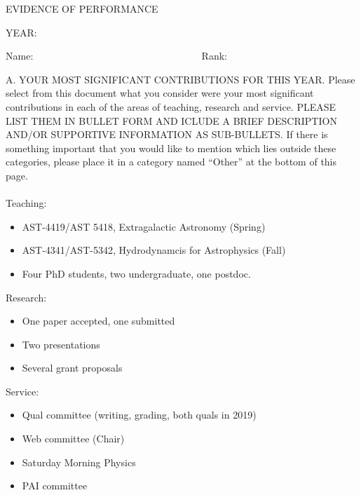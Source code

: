 \addtolength{\topmargin}{-.5in}
\addtolength{\textheight}{2.5cm}
\addtolength{\oddsidemargin}{-.75in}
\addtolength{\evensidemargin}{-.75in}
\addtolength{\textwidth}{.5in}


\centerline{EVIDENCE OF PERFORMANCE}
\bigskip
\centerline{YEAR: }
\bigskip
\noindent Name: 
\hbox{\ \ \ \ \ \ \ \
\ \ \ \ \ \ \ \ \ \ \ \ \ \ \ \ \ \ \ \ \ \ \ \ \ }
Rank: \underbar
{ }

\vskip 20pt

\noindent A. YOUR MOST SIGNIFICANT CONTRIBUTIONS FOR THIS YEAR.
Please select from this document what you consider were your most
significant contributions in each of the areas of teaching, research
and service. PLEASE LIST THEM IN BULLET FORM AND ICLUDE A BRIEF 
DESCRIPTION AND/OR SUPPORTIVE INFORMATION AS SUB-BULLETS. 
If there is something important that you would like to mention which
lies outside these categories, please
place it in a category named ``Other'' at the bottom of this page. \\ \\

\noindent
Teaching:

\begin{itemize}
\item AST-4419/AST 5418, Extragalactic Astronomy (Spring) 
\item AST-4341/AST-5342, Hydrodynamcis for Astrophysics (Fall)
\item Four PhD students, two undergraduate, one postdoc.
\end{itemize}

\noindent
Research:

\begin{itemize}
    \item One paper accepted, one submitted
    \item Two  presentations
    \item Several grant proposals
\end{itemize}

\noindent
Service:

\begin{itemize}
\item Qual committee (writing, grading, both quals in 2019)
\item Web committee (Chair)
\item Saturday Morning Physics
\item PAI committee
\end{itemize}

